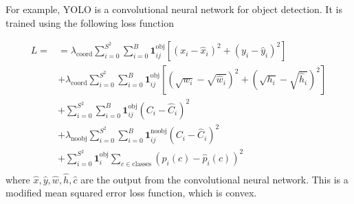 For example, YOLO is a convolutional neural network for object detection. It is trained using the following loss function

\begin{equation}
    \begin{split}
        L=
        &= \lambda_{\text{coord}}
        \sum_{i=0}^{S^2}\sum_{i=0}^{B}\mathbf{1}_{ij}^{\text{obj}}
        \left[(x_i-\hat{x}_i)^2+(y_i-\hat{y}_i)^2\right] \\
        &+ \lambda_{\text{coord}}
        \sum_{i=0}^{S^2}\sum_{i=0}^{B}\mathbf{1}_{ij}^{\text{obj}}
        \left[(\sqrt{w_i}-\sqrt{\hat{w}_i})^2+(\sqrt{h_i}-\sqrt{\hat{h}_i})^2\right] \\
        &+ \sum_{i=0}^{S^2}\sum_{i=0}^{B}\mathbf{1}_{ij}^{\text{obj}}
        \left(C_i-\hat{C}_i\right)^2\\
        &+ \lambda_{\text{noobj}}
        \sum_{i=0}^{S^2}\sum_{i=0}^{B}\mathbf{1}_{ij}^{\text{noobj}}
        \left(C_i-\hat{C}_i\right)^2\\
        &+ \sum_{i=0}^{S^2}\mathbf{1}_{i}^{\text{obj}}\sum_{c\in \text{classes}}
        (p_i(c)-\hat{p}_i(c))^2 \\
    \end{split}
\end{equation}
%
where $\hat{x}, \hat{y}, \hat{w}, \hat{h}, \hat{c}$ are the output from the convolutional neural network. This is a modified mean squared error loss function, which is convex.